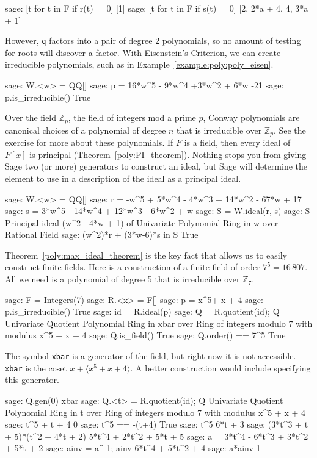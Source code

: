 %
\begin{sageexample}
sage: [t for t in F if r(t)==0]
[1]
sage: [t for t in F if s(t)==0]
[2, 2*a + 4, 4, 3*a + 1]
\end{sageexample}
%
However, \verb?q? factors into a pair of degree 2 polynomials, so no amount of testing for roots will discover a factor.
%
With Eisenstein's Criterion, we can create irreducible polynomials, such as in Example~\ref{example:poly:poly_eisen}.
%
\begin{sageexample}
sage: W.<w> = QQ[]
sage: p = 16*w^5 - 9*w^4 +3*w^2 + 6*w -21
sage: p.is_irreducible()
True
\end{sageexample}
%
Over the field ${\mathbb Z}_p$, the field of integers mod a prime $p$, Conway polynomials are canonical choices of a polynomial of degree $n$ that is irreducible over ${\mathbb Z}_p$.  See the exercise for more about these polynomials.
%
%
If $F$ is a field, then every ideal of $F[x]$ is principal (Theorem~\ref{poly:PI_theorem}).  Nothing stops you from giving Sage two (or more) generators to construct an ideal, but Sage will determine the element to use in a description of the ideal as a principal ideal.
%
\begin{sageexample}
sage: W.<w> = QQ[]
sage: r = -w^5 + 5*w^4 - 4*w^3 + 14*w^2 - 67*w + 17
sage: s = 3*w^5 - 14*w^4 + 12*w^3 - 6*w^2 + w
sage: S = W.ideal(r, s)
sage: S
Principal ideal (w^2 - 4*w + 1) of
Univariate Polynomial Ring in w over Rational Field
sage: (w^2)*r + (3*w-6)*s in S
True
\end{sageexample}
%
Theorem~\ref{poly:max_ideal_theorem} is the key fact that allows us to easily construct finite fields.  Here is a construction of a finite field of order $7^5=16\,807$.  All we need is a polynomial of degree 5 that is irreducible over ${\mathbb Z}_7$.
%
\begin{sageexample}
sage: F = Integers(7)
sage: R.<x> = F[]
sage: p = x^5+ x + 4
sage: p.is_irreducible()
True
sage: id = R.ideal(p)
sage: Q = R.quotient(id); Q
Univariate Quotient Polynomial Ring in xbar over
Ring of integers modulo 7 with modulus x^5 + x + 4
sage: Q.is_field()
True
sage: Q.order() == 7^5
True
\end{sageexample}
%
The symbol \verb?xbar? is a generator of the field, but right now it is not accessible.  \verb?xbar? is the coset $x + \langle x^5+ x + 4\rangle$.  A better construction would include specifying this generator.
%
\begin{sageexample}
sage: Q.gen(0)
xbar
sage: Q.<t> = R.quotient(id); Q
Univariate Quotient Polynomial Ring in t over
Ring of integers modulo 7 with modulus x^5 + x + 4
sage: t^5 + t + 4
0
sage: t^5 == -(t+4)
True
sage: t^5
6*t + 3
sage: (3*t^3 + t + 5)*(t^2 + 4*t + 2)
5*t^4 + 2*t^2 + 5*t + 5
sage: a = 3*t^4 - 6*t^3 + 3*t^2 + 5*t + 2
sage: ainv = a^-1; ainv
6*t^4 + 5*t^2 + 4
sage: a*ainv
1
\end{sageexample}
%
